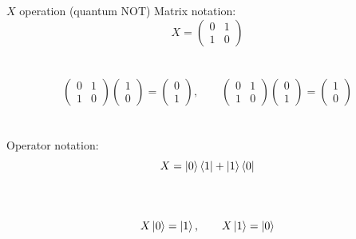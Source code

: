 \documentclass[aspectratio=169,12pt]{beamer}
\begin{document}
\begin{frame}{$X$ operation (quantum NOT)}
  Matrix notation:
  $$
    X = \begin{pmatrix}0 & 1 \\ 1 & 0\end{pmatrix}
  $$\\~\\
  $$
    \begin{pmatrix}0 & 1 \\ 1 & 0\end{pmatrix}
    \begin{pmatrix}1\\0\end{pmatrix}=
    \begin{pmatrix}0\\1\end{pmatrix},
    \qquad
    \begin{pmatrix}0 & 1 \\ 1 & 0\end{pmatrix}
    \begin{pmatrix}0\\1\end{pmatrix}=
    \begin{pmatrix}1\\0\end{pmatrix}
  $$
  ~\\~\\
  Operator notation: $$X = \ket 0 \bra 1 + \ket 1 \bra 0$$\\~\\
  $$
    X\ket 0 = \ket 1, \qquad
    X\ket 1 = \ket 0
  $$
  
\end{frame}
\end{document}
